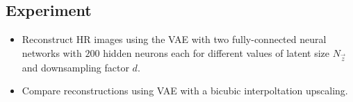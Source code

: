 
\subsection{Experiment}
\label{sub:experiments}

\begin{itemize}
	\item Reconstruct HR images using the VAE with two fully-connected neural networks with $200$ hidden neurons each for different values of latent size $N_{\vec{z}}$ and downsampling factor $d$.
	\item Compare reconstructions using VAE with a bicubic interpoltation upscaling.
\end{itemize}
